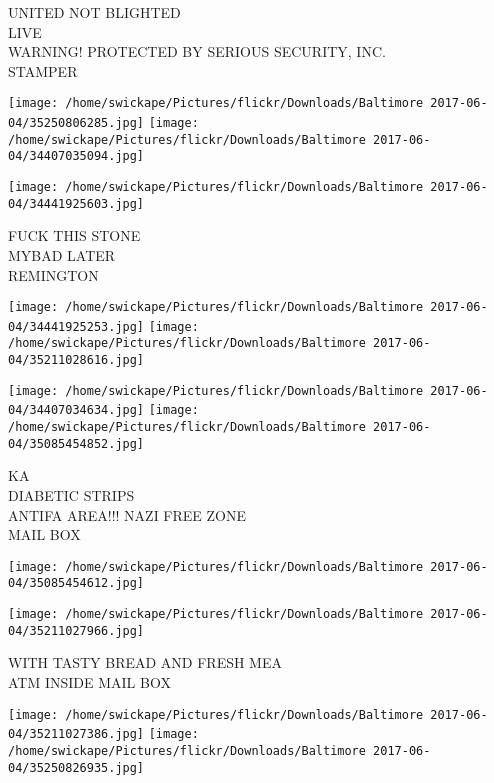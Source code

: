 \documentclass[10pt,letterpaper]{article}
\begin{document}
UNITED NOT BLIGHTED\\
LIVE\\
WARNING!  PROTECTED BY SERIOUS SECURITY, INC.\\
STAMPER\\
\pagebreak

\texttt{[image: /home/swickape/Pictures/flickr/Downloads/Baltimore 2017-06-04/35250806285.jpg]}
\texttt{[image: /home/swickape/Pictures/flickr/Downloads/Baltimore 2017-06-04/34407035094.jpg]}

\vspace{0.25in}
\texttt{[image: /home/swickape/Pictures/flickr/Downloads/Baltimore 2017-06-04/34441925603.jpg]}

FUCK THIS STONE\\
MYBAD LATER\\
REMINGTON\\
\pagebreak

\texttt{[image: /home/swickape/Pictures/flickr/Downloads/Baltimore 2017-06-04/34441925253.jpg]}
\texttt{[image: /home/swickape/Pictures/flickr/Downloads/Baltimore 2017-06-04/35211028616.jpg]}

\texttt{[image: /home/swickape/Pictures/flickr/Downloads/Baltimore 2017-06-04/34407034634.jpg]}
\texttt{[image: /home/swickape/Pictures/flickr/Downloads/Baltimore 2017-06-04/35085454852.jpg]}

KA\\
DIABETIC STRIPS\\
ANTIFA AREA!!! NAZI FREE ZONE\\
MAIL BOX\\
\pagebreak

\texttt{[image: /home/swickape/Pictures/flickr/Downloads/Baltimore 2017-06-04/35085454612.jpg]}

\vspace{0.25in}
\texttt{[image: /home/swickape/Pictures/flickr/Downloads/Baltimore 2017-06-04/35211027966.jpg]}

WITH TASTY BREAD AND FRESH MEA\\
ATM INSIDE MAIL BOX\\
\pagebreak

\texttt{[image: /home/swickape/Pictures/flickr/Downloads/Baltimore 2017-06-04/35211027386.jpg]}
\texttt{[image: /home/swickape/Pictures/flickr/Downloads/Baltimore 2017-06-04/35250826935.jpg]}
\end{document}
